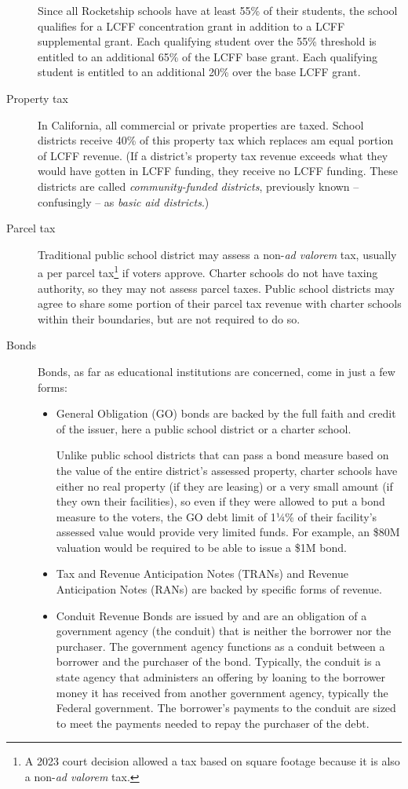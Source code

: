 \begin{description}
  Since all Rocketship schools have at least 55\% of their students, the school qualifies for a LCFF concentration grant in addition to a LCFF supplemental grant. Each qualifying student over the 55\% threshold is entitled to an additional 65\% of the LCFF base grant. Each qualifying student is entitled to an additional 20\% over the base LCFF grant.\\
  \item[Property tax] In California, all commercial or private properties are taxed. School districts receive 40\% of this property tax which replaces am equal portion of LCFF revenue. (If a district's property tax revenue exceeds what they would have gotten in LCFF funding, they receive no LCFF funding. These districts are called \textit{community-funded districts}, previously known – confusingly – as \textit{basic aid districts}.)
  \item [Parcel tax] Traditional public school district may assess a non-\textit{ad valorem} tax, usually a per parcel tax\footnote{A 2023 court decision allowed a tax based on square footage because it is also a non-\textit{ad valorem} tax.} if voters approve. Charter schools do not have taxing authority, so they may not assess parcel taxes. Public school districts may agree to share some portion of their parcel tax revenue with charter schools within their boundaries, but are not required to do so.
  \item[Bonds] Bonds, as far as educational institutions are concerned, come in just a few forms:
  \begin{itemize}
    \item General Obligation (GO) bonds are backed by the full faith and credit of the issuer, here a public school district or a charter school.

    Unlike public school districts that can pass a bond measure based on the value of the entire district's assessed property, charter schools have either no real property (if they are leasing) or a very small amount (if they own their facilities), so even if they were allowed to put a bond measure to the voters, the GO debt limit of 1¼\% of their facility's assessed value would provide very limited funds. For example, an \$80M valuation would be required to be able to issue a \$1M bond. 

    \item Tax and Revenue Anticipation Notes (TRANs) and Revenue Anticipation Notes (RANs) are backed by specific forms of revenue. 
    \item Conduit Revenue Bonds are issued by and are an obligation of a government agency (the conduit) that is neither the borrower nor the purchaser. The government agency functions as a conduit between a borrower and the purchaser of the bond. Typically, the conduit is a state agency that administers an offering by loaning to the borrower money it has received from another government agency, typically the Federal government. The borrower's payments to the conduit are sized to meet the payments needed to repay the purchaser of the debt.
  \end{itemize}


\end{description}
